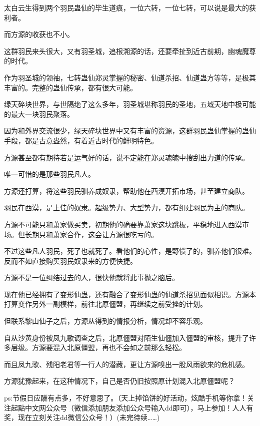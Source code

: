 \begin{this_body}
太白云生得到两个羽民蛊仙的毕生道痕，一位六转，一位七转，可以说是最大的获利者。

而方源的收获也不小。

这群羽民来头很大，又有羽圣城，追根溯源的话，还要牵扯到近古前期，幽魂魔尊的时代。

作为羽圣城的领袖，七转蛊仙郑灵掌握的秘密、仙道杀招、仙道蛊方等等，是极其丰富的。完整的蛊仙传承，都有很大可能。

绿天碎块世界，与世隔绝了这么多年，羽圣城堪称羽民的圣地，五域天地中极可能的最大一块羽民聚落。

因为和外界交流很少，绿天碎块世界中又有丰富的资源，这群羽民蛊仙掌握的蛊仙手段，都是古意盎然，有着近古时代的鲜明特色。

方源甚至都有期待若是运气好的话，说不定能在郑灵魂魄中搜刮出力道的传承。

唯一可惜的是那些羽民凡人。

方源还打算，将这些羽民驯养成奴隶，帮助他在西漠开拓市场，甚至建立商队。

羽民在西漠，是上佳的奴隶。超级势力、大型势力，都有组建羽民为主的商队。

方源不可能只和萧家做买卖，初期他的确要靠萧家这块跳板，平稳地进入西漠市场。但长期只和萧家合作，这会让方源很吃亏的。

不过这些凡人羽民，死了也就死了。看他们的心性，是野惯了的，驯养他们很难。反而不如直接购买羽民奴隶来的方便快捷。

方源不是一位纠结过去的人，很快他就将此事抛之脑后。

现在他已经拥有了变形仙蛊，还有融合了变形仙蛊的仙道杀招见面似相识。方源本打算变作另外一副模样，前往北原僵盟，再继续之前受挫的计划。

但联系黎山仙子之后，方源从得到的情报分析，情况却不容乐观。

自从沙黄身份被凤九歌调查之后，北原僵盟对陌生仙僵加入僵盟的审核，提升了许多层级。方源要混入北原僵盟，再也不会如之前那么轻松。

而且凤九歌、残阳老君等一行人的潜藏，更让方源嗅出一股风雨欲来的危机感。

方源犹豫起来，在这种情况下，自己是否仍旧按照原计划混入北原僵盟呢？

ps:节假日应酬有点多，不好意思了。（天上掉馅饼的好活动，炫酷手机等你拿！关注起點中文网公众号（微信添加朋友添加公众号输入dd即可），马上参加！人人有奖，现在立刻关注dd微信公众号！）(未完待续……)

\end{this_body}

